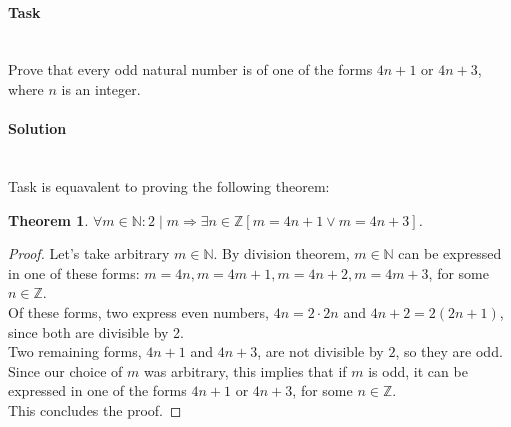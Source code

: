 \documentclass[11pt]{article}
\begin{document}
   \paragraph{Task}\mbox{} \\
      Prove that every odd natural number is of one of the forms $4n + 1$ or $4n + 3$, where $n$ is an integer.
   \paragraph{Solution}\mbox{} \\
   Task is equavalent to proving the following theorem:
   \newtheorem*{Theorem}{Theorem}
   \begin{Theorem}
       $\displaystyle \forall m \in \mathbb{N}: 2 \mid m \Rightarrow \exists n \in \mathbb{Z} \left[ m = 4n + 1 \lor m = 4n + 3\right]$.
   \end{Theorem}
   \begin{proof}
   Let's take arbitrary $m \in \mathbb{N}$.
   By division theorem, $m \in \mathbb{N}$ can be expressed in one of these forms: $m = 4n, m = 4m + 1, m = 4n + 2, m = 4m + 3$, for some $n \in \mathbb{Z}$. \\
   Of these forms, two express even numbers, $4n = 2 \cdot 2n$ and $4n + 2 = 2(2n + 1)$, since both are divisible by 2.\\
   Two remaining forms, $4n + 1$ and $4n + 3$, are not divisible by $2$, so they are odd.
   Since our choice of $m$ was arbitrary, this implies that if $m$ is odd, it can be expressed in one of the forms $4n + 1$ or $4n + 3$, for some $n \in \mathbb{Z}$.\\
   This concludes the proof.
   \end{proof}
\end{document}
